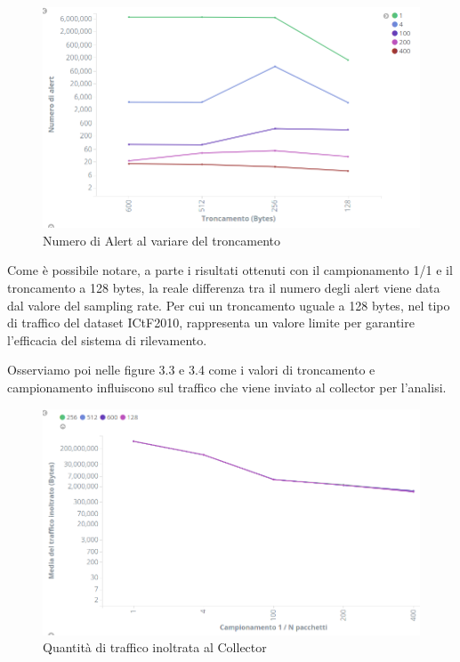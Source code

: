 \documentclass[12pt,a4paper,openright,twoside]{report}
\begin{document}
\begin{figure}[h!]
\begin{center}                          %
  \includegraphics[width=\textwidth]{images/ICTF--tunc-vs-samp.png}
  \caption{Numero di Alert al variare del troncamento}
  \label{}
\end{center}
\end{figure}

Come \`e possibile notare, a parte i risultati ottenuti con il campionamento 1/1 e il
troncamento a 128 bytes, la reale differenza tra il numero degli alert viene data dal
valore del sampling rate. Per cui un troncamento uguale a 128 bytes, nel tipo di traffico del dataset ICtF2010,
rappresenta un valore limite per garantire l'efficacia del sistema di rilevamento.

Osserviamo poi nelle figure 3.3 e 3.4 come i valori di troncamento e campionamento influiscono sul traffico
che viene inviato al collector per l'analisi.

\begin{figure}[h!]
\begin{center}                          %
  \includegraphics[width=\textwidth]{images/ICTF-samp-vs-traffic.png}
  \caption{Quantit\`a di traffico inoltrata al Collector}
  \label{}
\end{center}
\end{figure}
\end{document}
